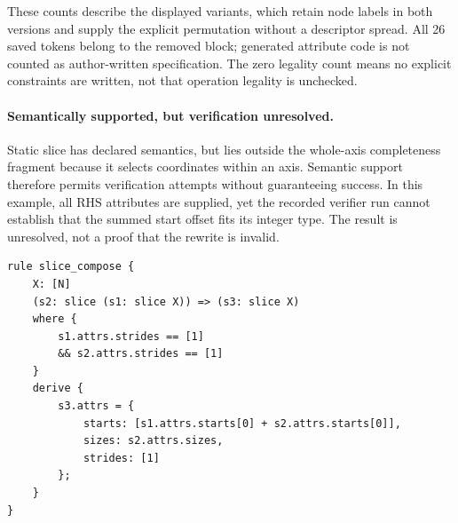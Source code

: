 These counts describe the displayed variants, which retain node labels in
both versions and supply the explicit permutation without a descriptor
spread. All 26 saved tokens belong to the removed  block;
generated attribute code is not counted as author-written specification.
The zero legality count means no explicit constraints are written, not that
operation legality is unchecked.
\FloatBarrier

\paragraph{Semantically supported, but verification unresolved.}
Static slice has declared semantics, but lies outside the whole-axis
completeness fragment because it selects coordinates within an axis.
Semantic support therefore permits verification attempts without
guaranteeing success. In this example, all RHS attributes are supplied,
yet the recorded verifier run cannot establish that the summed start
offset fits its integer type. The result is unresolved, not a proof
that the rewrite is invalid.

\begin{lstlisting}[language=TEPL,caption={Slice composition with supplied attributes.}]
rule slice_compose {
    X: [N]
    (s2: slice (s1: slice X)) => (s3: slice X)
    where {
        s1.attrs.strides == [1]
        && s2.attrs.strides == [1]
    }
    derive {
        s3.attrs = {
            starts: [s1.attrs.starts[0] + s2.attrs.starts[0]],
            sizes: s2.attrs.sizes,
            strides: [1]
        };
    }
}
\end{lstlisting}
